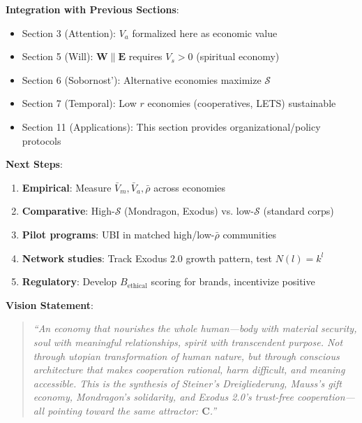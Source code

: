 \documentclass[11pt,a4paper]{article}
\theoremstyle{definition}
\theoremstyle{remark}
\newcommand{\EE}{\mathbf{E}}
\newcommand{\WW}{\mathbf{W}}
\begin{document}
\begin{small}
\begin{enumerate}
\begin{mdframed}[backgroundcolor=green!10,linewidth=2pt,linecolor=green!70!black]
\textbf{Integration with Previous Sections}:
\begin{itemize}[nosep]
    \item Section 3 (Attention): \(V_a\) formalized here as economic value
    \item Section 5 (Will): \(\WW \parallel \EE\) requires \(V_s > 0\) (spiritual economy)
    \item Section 6 (Sobornost'): Alternative economies maximize \(\mathcal{S}\)
    \item Section 7 (Temporal): Low \(r\) economies (cooperatives, LETS) sustainable
    \item Section 11 (Applications): This section provides organizational/policy protocols
\end{itemize}

\textbf{Next Steps}:
\begin{enumerate}[nosep]
    \item \textbf{Empirical}: Measure \(\bar{V}_m, \bar{V}_a, \bar{\rho}\) across economies
    \item \textbf{Comparative}: High-\(\mathcal{S}\) (Mondragon, Exodus) vs. low-\(\mathcal{S}\) (standard corps)
    \item \textbf{Pilot programs}: UBI in matched high/low-\(\bar{\rho}\) communities
    \item \textbf{Network studies}: Track Exodus 2.0 growth pattern, test \(N(l) = k^l\)
    \item \textbf{Regulatory}: Develop \(B_{\text{ethical}}\) scoring for brands, incentivize positive
\end{enumerate}

\textbf{Vision Statement}:
\begin{quote}
\textit{``An economy that nourishes the whole human—body with material security, soul with meaningful relationships, spirit with transcendent purpose. Not through utopian transformation of human nature, but through conscious architecture that makes cooperation rational, harm difficult, and meaning accessible. This is the synthesis of Steiner's Dreigliederung, Mauss's gift economy, Mondragon's solidarity, and Exodus 2.0's trust-free cooperation—all pointing toward the same attractor: \(\mathbf{C}\).''}
\end{quote}
\end{mdframed}

\vspace{2em}

\begin{figure}[H]
\centering
{}
\end{figure}
\end{enumerate}
\end{small}
\end{document}
